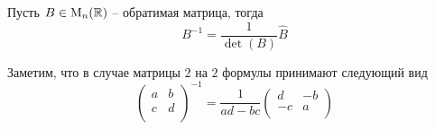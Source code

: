\begin{claim}
Пусть $B\in\operatorname{M}_{n}(\mathbb R)$ -- обратимая матрица, тогда 
\[
B^{-1} = \frac{1}{\det(B)}\hat B
\]
\end{claim}

Заметим, что в случае матрицы $2$ на $2$ формулы принимают следующий вид
\[
\begin{pmatrix}
{a}&{b}\\
{c}&{d}\\
\end{pmatrix}^{-1}
=
\frac{1}{ad - bc}
\begin{pmatrix}
{d}&{-b}\\
{-c}&{a}\\
\end{pmatrix}
\]
